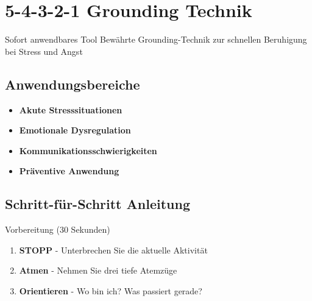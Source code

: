
\section{5-4-3-2-1 Grounding Technik}
\label{sec:tool-5-4-3-2-1-grounding}

\begin{ctmmOrangeBox}{Sofort anwendbares Tool}
Bewährte Grounding-Technik zur schnellen Beruhigung bei Stress und Angst
\end{ctmmOrangeBox}

\subsection{Anwendungsbereiche}
\begin{itemize}
    \item \textcolor{ctmmRed}{\textbf{Akute Stresssituationen}}
    \item \textcolor{ctmmBlue}{\textbf{Emotionale Dysregulation}}
    \item \textcolor{ctmmPurple}{\textbf{Kommunikationsschwierigkeiten}}
    \item \textcolor{ctmmGreen}{\textbf{Präventive Anwendung}}
\end{itemize}

\subsection{Schritt-für-Schritt Anleitung}

\begin{ctmmBlueBox}{Vorbereitung (30 Sekunden)}
\begin{enumerate}
    \item \textbf{STOPP} - Unterbrechen Sie die aktuelle Aktivität
    \item \textbf{Atmen} - Nehmen Sie drei tiefe Atemzüge
    \item \textbf{Orientieren} - Wo bin ich? Was passiert gerade?
\end{enumerate}
\end{ctmmBlueBox}

\vspace{0.5cm}

